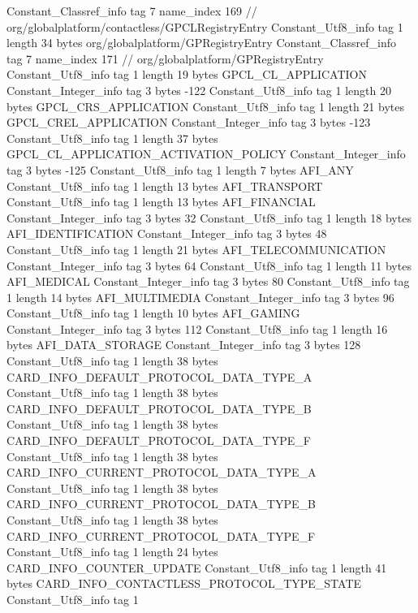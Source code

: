 {{{		}
		Constant_Classref_info {
			tag	7
			name_index	169		// org/globalplatform/contactless/GPCLRegistryEntry
		}
		Constant_Utf8_info {
			tag	1
			length	34
			bytes	org/globalplatform/GPRegistryEntry
		}
		Constant_Classref_info {
			tag	7
			name_index	171		// org/globalplatform/GPRegistryEntry
		}
		Constant_Utf8_info {
			tag	1
			length	19
			bytes	GPCL_CL_APPLICATION
		}
		Constant_Integer_info {
			tag	3
			bytes	-122
		}
		Constant_Utf8_info {
			tag	1
			length	20
			bytes	GPCL_CRS_APPLICATION
		}
		Constant_Utf8_info {
			tag	1
			length	21
			bytes	GPCL_CREL_APPLICATION
		}
		Constant_Integer_info {
			tag	3
			bytes	-123
		}
		Constant_Utf8_info {
			tag	1
			length	37
			bytes	GPCL_CL_APPLICATION_ACTIVATION_POLICY
		}
		Constant_Integer_info {
			tag	3
			bytes	-125
		}
		Constant_Utf8_info {
			tag	1
			length	7
			bytes	AFI_ANY
		}
		Constant_Utf8_info {
			tag	1
			length	13
			bytes	AFI_TRANSPORT
		}
		Constant_Utf8_info {
			tag	1
			length	13
			bytes	AFI_FINANCIAL
		}
		Constant_Integer_info {
			tag	3
			bytes	32
		}
		Constant_Utf8_info {
			tag	1
			length	18
			bytes	AFI_IDENTIFICATION
		}
		Constant_Integer_info {
			tag	3
			bytes	48
		}
		Constant_Utf8_info {
			tag	1
			length	21
			bytes	AFI_TELECOMMUNICATION
		}
		Constant_Integer_info {
			tag	3
			bytes	64
		}
		Constant_Utf8_info {
			tag	1
			length	11
			bytes	AFI_MEDICAL
		}
		Constant_Integer_info {
			tag	3
			bytes	80
		}
		Constant_Utf8_info {
			tag	1
			length	14
			bytes	AFI_MULTIMEDIA
		}
		Constant_Integer_info {
			tag	3
			bytes	96
		}
		Constant_Utf8_info {
			tag	1
			length	10
			bytes	AFI_GAMING
		}
		Constant_Integer_info {
			tag	3
			bytes	112
		}
		Constant_Utf8_info {
			tag	1
			length	16
			bytes	AFI_DATA_STORAGE
		}
		Constant_Integer_info {
			tag	3
			bytes	128
		}
		Constant_Utf8_info {
			tag	1
			length	38
			bytes	CARD_INFO_DEFAULT_PROTOCOL_DATA_TYPE_A
		}
		Constant_Utf8_info {
			tag	1
			length	38
			bytes	CARD_INFO_DEFAULT_PROTOCOL_DATA_TYPE_B
		}
		Constant_Utf8_info {
			tag	1
			length	38
			bytes	CARD_INFO_DEFAULT_PROTOCOL_DATA_TYPE_F
		}
		Constant_Utf8_info {
			tag	1
			length	38
			bytes	CARD_INFO_CURRENT_PROTOCOL_DATA_TYPE_A
		}
		Constant_Utf8_info {
			tag	1
			length	38
			bytes	CARD_INFO_CURRENT_PROTOCOL_DATA_TYPE_B
		}
		Constant_Utf8_info {
			tag	1
			length	38
			bytes	CARD_INFO_CURRENT_PROTOCOL_DATA_TYPE_F
		}
		Constant_Utf8_info {
			tag	1
			length	24
			bytes	CARD_INFO_COUNTER_UPDATE
		}
		Constant_Utf8_info {
			tag	1
			length	41
			bytes	CARD_INFO_CONTACTLESS_PROTOCOL_TYPE_STATE
		}
		Constant_Utf8_info {
			tag	1
}}}
